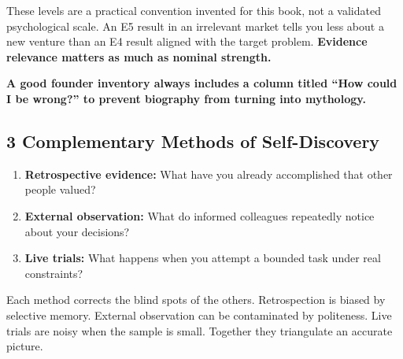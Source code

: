 These levels are a practical convention invented for this book, not a validated psychological scale. An E5 result in an irrelevant market tells you less about a new venture than an E4 result aligned with the target problem. \textbf{Evidence relevance matters as much as nominal strength.}

\textbf{A good founder inventory always includes a column titled ``How could I be wrong?'' to prevent biography from turning into mythology.}

\subsection{3 Complementary Methods of Self-Discovery}

\begin{enumerate}[label=\textbf{\arabic*.},leftmargin=11pt,itemsep=1.5pt,topsep=1.5pt,parsep=0pt]
  \item \textbf{Retrospective evidence:} What have you already accomplished that other people valued?
  \item \textbf{External observation:} What do informed colleagues repeatedly notice about your decisions?
  \item \textbf{Live trials:} What happens when you attempt a bounded task under real constraints?
\end{enumerate}

Each method corrects the blind spots of the others. Retrospection is biased by selective memory. External observation can be contaminated by politeness. Live trials are noisy when the sample is small. Together they triangulate an accurate picture.
